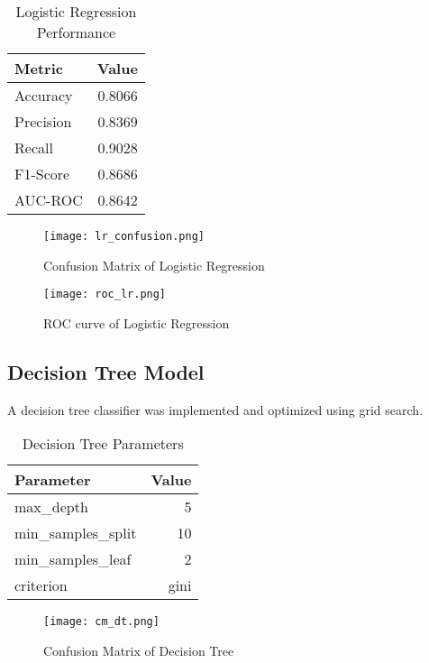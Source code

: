 \documentclass[12pt]{article}
\begin{document}
\begin{table}[H]
\centering
\caption{Logistic Regression Performance}
\label{tab:logistic_perf}
\begin{tabular}{lr}
\toprule
\textbf{Metric} & \textbf{Value} \\
\midrule
Accuracy & 0.8066 \\
Precision & 0.8369 \\
Recall & 0.9028 \\
F1-Score & 0.8686 \\
AUC-ROC & 0.8642 \\
\bottomrule
\end{tabular}
\end{table}


\begin{figure}[H]
    \centering
    \texttt{[image: lr\_confusion.png]}
    \caption{Confusion Matrix of Logistic Regression}
    \label{fig:example}
\end{figure}

\begin{figure}[H]
    \centering
    \texttt{[image: roc\_lr.png]}
    \caption{ROC curve of Logistic Regression}
    \label{fig:example}
\end{figure}

\subsection{Decision Tree Model}
A decision tree classifier was implemented and optimized using grid search.

\begin{table}[H]
\centering
\caption{Decision Tree Parameters}
\label{tab:dt_params}
\begin{tabular}{lr}
\toprule
\textbf{Parameter} & \textbf{Value} \\
\midrule
max\_depth & 5 \\
min\_samples\_split & 10 \\
min\_samples\_leaf & 2 \\
criterion & gini \\
\bottomrule
\end{tabular}
\end{table}

\begin{figure}[H]
    \centering
    \texttt{[image: cm\_dt.png]}
    \caption{Confusion Matrix of Decision Tree}
    \label{fig:example}
\end{figure}
\end{document}

